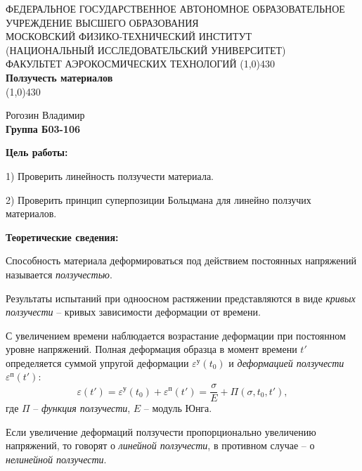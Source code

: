 \documentclass[a4paper,12pt]{article}
\begin{document}
\begin{titlepage}
\begin{center}
\large{\small ФЕДЕРАЛЬНОЕ ГОСУДАРСТВЕННОЕ АВТОНОМНОЕ ОБРАЗОВАТЕЛЬНОЕ\\ УЧРЕЖДЕНИЕ ВЫСШЕГО ОБРАЗОВАНИЯ \\ МОСКОВСКИЙ ФИЗИКО-ТЕХНИЧЕСКИЙ ИНСТИТУТ\\ (НАЦИОНАЛЬНЫЙ ИССЛЕДОВАТЕЛЬСКИЙ УНИВЕРСИТЕТ)\\ ФАКУЛЬТЕТ АЭРОКОСМИЧЕСКИХ ТЕХНОЛОГИЙ}
\vfill
\line(1,0){430}\\[1mm]
\huge\textbf{Ползучесть материалов}\\
\line(1,0){430}\\[1mm]
\vfill
\begin{flushright}
\normalsize{Рогозин Владимир}\\
\normalsize{\textbf{Группа Б03-106}}\\
\end{flushright}
\end{center}
\end{titlepage}

\textbf{Цель работы:} 

1) Проверить линейность ползучести материала. 

2) Проверить принцип суперпозиции Больцмана для линейно ползучих материалов.

\textbf{Теоретические сведения:} 

Способность материала деформироваться под действием постоянных напряжений называется \textit{ползучестью}. 

Результаты испытаний при одноосном растяжении представляются в виде \textit{кривых ползучести} -- кривых зависимости деформации от времени. 

С увеличением времени наблюдается возрастание деформации при постоянном уровне напряжений. Полная деформация образца в момент времени $t'$ определяется суммой упругой деформации $\varepsilon^у (t_0)$ и \textit{деформацией ползучести} $\varepsilon^п (t')$:
\[\varepsilon (t') = \varepsilon^у (t_0) + \varepsilon^п (t') = \frac{\sigma}{E} + \Pi (\sigma, t_0, t'),\]
где $\Pi$ -- \textit{функция ползучести}, $E$ -- модуль Юнга.

Если увеличение деформаций ползучести пропорционально увеличению напряжений, то говорят о \textit{линейной ползучести}, в противном случае -- о \textit{нелинейной ползучести}.
\end{document}
